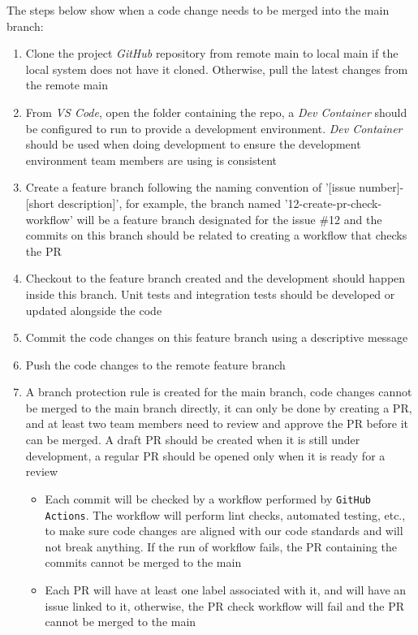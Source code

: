 \documentclass{article}
\begin{document}
\begin{itemize}
        The steps below show when a code change needs to be merged into the main branch: \\
        \begin{enumerate}
            \item Clone the project \textit{GitHub} repository from remote main to local main if the local system does not have it cloned. Otherwise, pull the latest changes from the remote main
            \item From \textit{VS Code}, open the folder containing the repo, a \textit{Dev Container} should be configured to run to provide a development environment. \textit{Dev Container} should be used when doing development to ensure the development environment team members are using is consistent
            \item Create a feature branch following the naming convention of '[issue number]-[short description]', for example, the branch named '12-create-pr-check-workflow' will be a feature branch designated for the issue \#12 and the commits on this branch should be related to creating a workflow that checks the PR
            \item Checkout to the feature branch created and the development should happen inside this branch. Unit tests and integration tests should be developed or updated alongside the code
            \item Commit the code changes on this feature branch using a descriptive message
            \item Push the code changes to the remote feature branch
            \item A branch protection rule is created for the main branch, code changes cannot be merged to the main branch directly, it can only be done by creating a PR, and at least two team members need to review and approve the PR before it can be merged. A draft PR should be created when it is still under development, a regular PR should be opened only when it is ready for a review
              \begin{itemize}
                \item Each commit will be checked by a workflow performed by \texttt{GitHub Actions}. The workflow will perform lint checks, automated testing, etc., to make sure code changes are aligned with our code standards and will not break anything. If the run of workflow fails, the PR containing the commits cannot be merged to the main
                \item Each PR will have at least one label associated with it, and will have an issue linked to it, otherwise, the PR check workflow will fail and the PR cannot be merged to the main

\end{itemize}
\end{enumerate}
\end{itemize}
\end{document}

